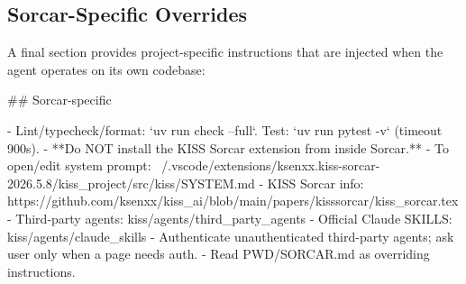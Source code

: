 \documentclass{article}
\begin{document}
\subsection{Sorcar-Specific Overrides}

A final section provides project-specific instructions that are injected when the agent operates on its own codebase:

\begin{prompt}
## Sorcar-specific

- Lint/typecheck/format: `uv run check --full`. Test: `uv run pytest -v` (timeout 900s).
- **Do NOT install the KISS Sorcar extension from inside Sorcar.**
- To open/edit system prompt: ~/.vscode/extensions/ksenxx.kiss-sorcar-2026.5.8/kiss_project/src/kiss/SYSTEM.md
- KISS Sorcar info: https://github.com/ksenxx/kiss_ai/blob/main/papers/kisssorcar/kiss_sorcar.tex
- Third-party agents: kiss/agents/third_party_agents
- Official Claude SKILLS: kiss/agents/claude_skills
- Authenticate unauthenticated third-party agents; ask user only when a page needs auth.
- Read PWD/SORCAR.md as overriding instructions.
\end{prompt}
\end{document}
